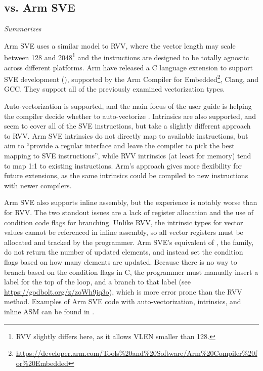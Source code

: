 \subsection{vs. Arm SVE}\label{chap:soft:compiling:armsve}
\emph{Summarizes \cite{armltdArmCompilerScalable2019}}

Arm SVE uses a similar model to RVV, where the vector length may scale between 128 and 2048\footnote{RVV slightly differs here, as it allows VLEN smaller than 128.} and the instructions are designed to be totally agnostic across different platforms\cite{stephensARMScalableVector2017}.
Arm have released a C language extension to support SVE development (\cite{armltdARMLanguageExtensions2020}), supported by the Arm Compiler for Embedded\footnote{\url{https://developer.arm.com/Tools\%20and\%20Software/Arm\%20Compiler\%20for\%20Embedded}}, Clang, and GCC.
They support all of the previously examined vectorization types.

Auto-vectorization is supported, and the main focus of the user guide is helping the compiler decide whether to auto-vectorize \cite{armltdArmCompilerScalable2019}.
Intrinsics are also supported, and seem to cover all of the SVE instructions, but take a slightly different approach to RVV.
Arm SVE intrinsics do not directly map to available instructions, but aim to \enquote{provide a regular interface and leave the compiler to pick the best mapping to SVE instructions}, while RVV intrinsics (at least for memory) tend to map 1:1 to existing instructions.
Arm's approach gives more flexibility for future extensions, as the same intrinsics could be compiled to new instructions with newer compilers.

Arm SVE also supports inline assembly, but the experience is notably worse than for RVV.
The two standout issues are a lack of register allocation and the use of condition code flags for branching.
Unlike RVV, the intrinsic types for vector values cannot be referenced in inline assembly\cite{stephensARMScalableVector2017}, so all vector registers must be allocated and tracked by the programmer.
Arm SVE's equivalent of , the  family\cite{armltdARMLanguageExtensions2020}, do not return the number of updated elements, and instead set the condition flags based on how many elements are updated.
Because there is no way to branch based on the condition flags in C, the programmer must manually insert a label for the top of the loop, and a branch to that label (see \url{https://godbolt.org/z/zoWh9jq3o}), which is more error prone than the RVV method.
Examples of Arm SVE code with auto-vectorization, intrinsics, and inline ASM can be found in .


